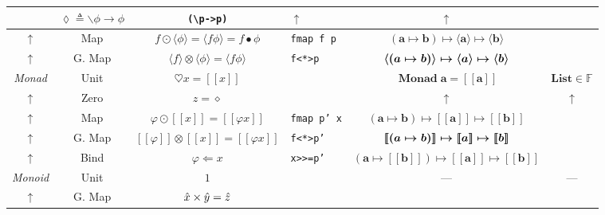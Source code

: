 \documentclass{jsarticle}
\def\[{[\![}
\def\]{]\!]}
\newcommand{\boldsym}[1]{{\boldsymbol{#1}}}
\newcommand{\htypename}[1]{\mathbf{#1}}
\newcommand{\htypeclassname}[1]{\mathbb{#1}}
\begin{document}
\begin{center}
\begin{tabular}{||c|c||c|l|c|c||}
    &$\lozenge\triangleq\backslash\phi\longrightarrow\phi$
    &\verb|(\p->p)|
    &$\uparrow$
    &$\uparrow$\\
    \hline
$\uparrow$
    &Map
    &$f\odot\langle\phi\rangle=\langle f\phi\rangle=f\bullet\phi$
    &\texttt{fmap f p}
    &$(\htypename{a}\mapsto\htypename{b})\mapsto\boldsym{\langle a\rangle}\mapsto\boldsym{\langle b\rangle}$
    &\\
    \hline
$\uparrow$
    &G. Map
    &$\langle f\rangle\otimes\langle\phi\rangle=\langle f\phi\rangle$
    &\texttt{f<*>p}
    &$\boldsym{\langle}(\boldmath{a}\mapsto\boldmath{b})\boldsym{\rangle}\mapsto\boldsym{\langle a\rangle}\mapsto\boldsym{\langle b\rangle}$
    &\\
    \hline
    \hline
\textsl{Monad}
    &Unit
    &$\heartsuit x=\[x\]$
    &
    &$\mathop{\textbf{Monad}}\htypename{a}=\boldsym{\[a\]}$
    &$\textbf{List}\in\htypeclassname{F}$\\
    \hline
$\uparrow$
    &Zero
    &$z=\diamond$
    &
    &$\uparrow$
    &$\uparrow$\\
    \hline
$\uparrow$
    &Map
    &$\varphi\odot\[x\]=\[\varphi x\]$
    &\texttt{fmap p' x}
    &$(\htypename{a}\mapsto\htypename{b})\mapsto\boldsym{\[a\]}\mapsto\boldsym{\[b\]}$
    &\\
    \hline
$\uparrow$
    &G. Map
    &$\[\varphi\]\otimes\[x\]=\[\varphi x\]$
    &\texttt{f<*>p'}
    &$\boldsym{\[}(\boldmath{a}\mapsto\boldmath{b})\boldsym{\]}\mapsto\boldsym{\[a\]}\mapsto\boldsym{\[b\]}$
    &\\
    \hline
$\uparrow$
    &Bind
    &$\varphi\Leftarrow x$
    &\texttt{x>>=p'}
    &$(\htypename{a}\mapsto\boldsym{\[b\]})\mapsto\boldsym{\[a\]}\mapsto\boldsym{\[b\]}$
    &\\
    \hline
    \hline
\textsl{Monoid}
    &Unit
    &$1$
    &
    &---
    &---\\
    \hline
$\uparrow$
    &G. Map
    &$\Hat{x}\times\Hat{y}=\Hat{z}$
    &
    &
    &\\
    \hline
\end{tabular}
\end{center}
\end{document}
